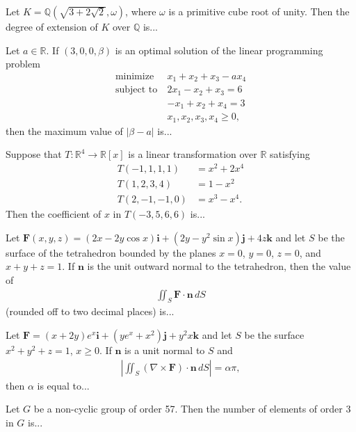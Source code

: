 \item Let \(K = \mathbb{Q}(\sqrt{3 + 2\sqrt{2}}, \omega)\), where \(\omega\) is a primitive cube root of unity. Then the degree of extension of \(K\) over \(\mathbb{Q}\) is...

\item Let \(a \in \mathbb{R}\). If \((3,0,0,\beta)\) is an optimal solution of the linear programming problem
    \begin{align*}
        \text{minimize} \ & x_1 + x_2 + x_3 - ax_4 \\
        \text{subject to} \ & 2x_1 - x_2 + x_3 = 6 \\
        & -x_1 + x_2 + x_4 = 3 \\
        & x_1, x_2, x_3, x_4 \geq 0,
    \end{align*}
    then the maximum value of \(|\beta - a|\) is...

\item Suppose that \(T: \mathbb{R}^4 \rightarrow \mathbb{R}[x]\) is a linear transformation over \(\mathbb{R}\) satisfying
\begin{align*}
    T(-1,1,1,1) &= x^2 + 2x^4 \\
    T(1,2,3,4) &= 1 - x^2 \\
    T(2,-1,-1,0) &= x^3 - x^4.
\end{align*}
Then the coefficient of \(x\) in \(T(-3,5,6,6)\) is...

\item Let \(\mathbf{F}(x,y,z) = (2x - 2y\cos x)\mathbf{i} + (2y - y^2\sin x)\mathbf{j} + 4z\mathbf{k}\) and let \(S\) be the surface of the tetrahedron bounded by the planes \(x = 0\), \(y = 0\), \(z = 0\), and \(x + y + z = 1\). If \(\mathbf{n}\) is the unit outward normal to the tetrahedron, then the value of
\begin{align*}
    \iint_S \mathbf{F} \cdot \mathbf{n} \, dS 
\end{align*}
(rounded off to two decimal places) is...

\item Let \(\mathbf{F} = (x + 2y)e^x \mathbf{i} + (ye^x + x^2)\mathbf{j} + y^2x\mathbf{k}\) and let \(S\) be the surface \(x^2 + y^2 + z = 1\), \(x \geq 0\). If \(\mathbf{n}\) is a unit normal to \(S\) and
\begin{align*}
    \left| \iint_S (\nabla \times \mathbf{F}) \cdot \mathbf{n} \, dS \right| = \alpha \pi, 
\end{align*}
then \(\alpha\) is equal to...

\item Let \(G\) be a non-cyclic group of order 57. Then the number of elements of order 3 in \(G\) is...

